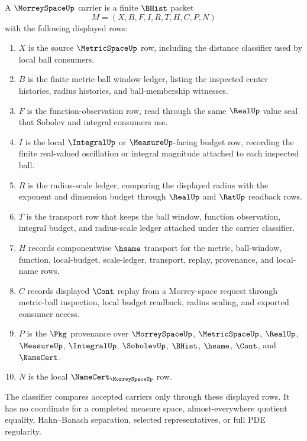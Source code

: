 \begin{definition}
\label{def:morrey-space-carrier}
A $\MorreySpaceUp$ carrier is a finite $\BHist$ packet
$$
M=(X,B,F,I,R,T,H,C,P,N)
$$
with the following displayed rows:
\begin{enumerate}
\item $X$ is the source $\MetricSpaceUp$ row, including the distance classifier used by local ball consumers.
\item $B$ is the finite metric-ball window ledger, listing the inspected center histories, radius histories, and ball-membership witnesses.
\item $F$ is the function-observation row, read through the same $\RealUp$ value seal that Sobolev and integral consumers use.
\item $I$ is the local $\IntegralUp$ or $\MeasureUp$-facing budget row, recording the finite real-valued oscillation or integral magnitude attached to each inspected ball.
\item $R$ is the radius-scale ledger, comparing the displayed radius with the exponent and dimension budget through $\RealUp$ and $\RatUp$ readback rows.
\item $T$ is the transport row that keeps the ball window, function observation, integral budget, and radius-scale ledger attached under the carrier classifier.
\item $H$ records componentwise $\hsame$ transport for the metric, ball-window, function, local-budget, scale-ledger, transport, replay, provenance, and local-name rows.
\item $C$ records displayed $\Cont$ replay from a Morrey-space request through metric-ball inspection, local budget readback, radius scaling, and exported consumer access.
\item $P$ is the $\Pkg$ provenance over $\MorreySpaceUp$, $\MetricSpaceUp$, $\RealUp$, $\MeasureUp$, $\IntegralUp$, $\SobolevUp$, $\BHist$, $\hsame$, $\Cont$, and $\NameCert$.
\item $N$ is the local $\NameCert_{\MorreySpaceUp}$ row.
\end{enumerate}
The classifier compares accepted carriers only through these displayed rows. It has no coordinate for a completed measure space, almost-everywhere quotient equality, Hahn--Banach separation, selected representatives, or full PDE regularity.
\end{definition}

